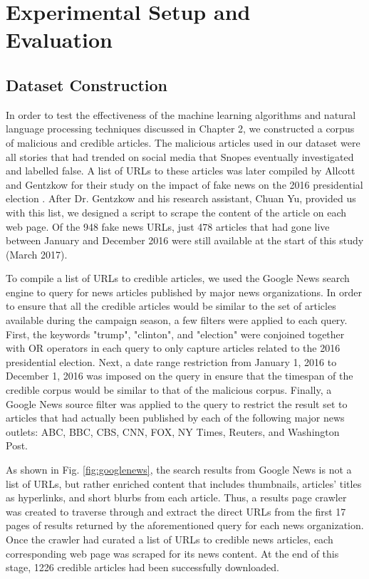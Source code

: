 \chapter[Experimental Setup and Evaluation]{Experimental Setup \newline and Evaluation}

\section{Dataset Construction} \label{datasetConstruction}

In order to test the effectiveness of the machine learning algorithms and natural language processing techniques discussed in Chapter 2, we constructed a corpus of malicious and credible articles.  The malicious articles used in our dataset were all stories that had trended on social media that Snopes eventually investigated and labelled false.  A list of URLs to these articles was later compiled by Allcott and Gentzkow for their study on the impact of fake news on the 2016 presidential election \cite{gentzkow}.  After Dr. Gentzkow and his research assistant, Chuan Yu, provided us with this list, we designed a script to scrape the content of the article on each web page.  Of the 948 fake news URLs, just 478 articles that had gone live between January and December 2016 were still available at the start of this study (March 2017).

To compile a list of URLs to credible articles, we used the Google News search engine to query for news articles published by major news organizations.  In order to ensure that all the credible articles would be similar to the set of articles available during the campaign season, a few filters were applied to each query.  First, the keywords "trump", "clinton", and "election" were conjoined together with OR operators in each query to only capture articles related to the 2016 presidential election.  Next, a date range restriction from January 1, 2016 to December 1, 2016 was imposed on the query in ensure that the timespan of the credible corpus would be similar to that of the malicious corpus.  Finally, a Google News source filter was applied to the query to restrict the result set to articles that had actually been published by each of the following major news outlets: ABC, BBC, CBS, CNN, FOX, NY Times, Reuters, and Washington Post.

As shown in Fig. \ref{fig:googlenews}, the search results from Google News is not a list of URLs, but rather enriched content that includes thumbnails, articles' titles as hyperlinks, and short blurbs from each article.  Thus, a results page crawler was created to traverse through and extract the direct URLs from the first 17 pages of results returned by the aforementioned query for each news organization.  Once the crawler had curated a list of URLs to credible news articles, each corresponding web page was scraped for its news content.  At the end of this stage, 1226 credible articles had been successfully downloaded.


